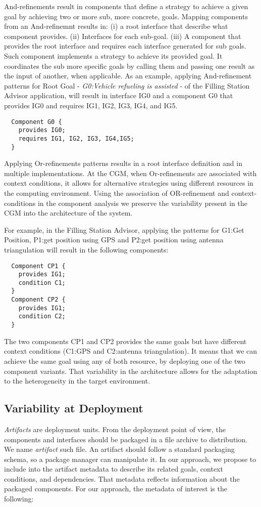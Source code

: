 And-refinements result in components that define a strategy to achieve a given goal by achieving two or more sub, more concrete, goals.
Mapping components from an And-refinemnt results in: (i) a root interface that describe what component provides. (ii) Interfaces for each sub-goal. (iii) A component that provides the root interface and requires each interface generated for sub goals.
Such component implements a strategy to achieve its provided goal. It coordinates the sub more specific goals by calling them and passing one result as the input of another, when applicable.
As an example, applying And-refinement patterns for Root Goal - \emph{G0:Vehicle refueling is assisted} - of the Filling Station Advisor application, will result in interface IG0 and a component G0 that provides IG0 and requires IG1, IG2, IG3, IG4, and IG5.
\begin{lstlisting}
  Component G0 {
    provides IG0;
    requires IG1, IG2, IG3, IG4,IG5;
  }
\end{lstlisting}

Applying Or-refinements patterns results in a root interface definition and in multiple implementations. At the CGM, when Or-refinements are associated with context conditions, it allows for alternative strategies using different resources in the computing environment. Using the association of OR-refinement and context-conditions in the component analysis we preserve the variability present in the CGM into the architecture of the system.

For example, in the Filling Station Advisor, applying the patterns for G1:Get Position, P1:get position using GPS and P2:get position using antenna triangulation will result in the following components:

\begin{lstlisting}
  Component CP1 {
    provides IG1;
    condition C1;
  }
  Component CP2 {
    provides IG1;
    condition C2;
  }
\end{lstlisting}

The two components CP1 and CP2 provides the same goals but have different context conditions (C1:GPS and C2:antenna triangulation). It means that we can achieve the same goal using any of both resource, by deploying one of the two component variants.
That variability in the architecture allows for the adaptation to the heterogeneity in the target environment.

\subsection{Variability at Deployment}
\label{sec_artifacts}
\emph{Artifacts} are deployment units.
From the deployment point of view, the components and interfaces should be packaged in a file archive to distribution. We name \emph{artifact} such file.
An artifact should follow a standard packaging schema, so a package manager can manipulate it.
In our approach, we propose to include into the artifact metadata to describe its related goals, context conditions, and dependencies. That metadata reflects information about the packaged components. For our approach, the metadata of interest is the following:

